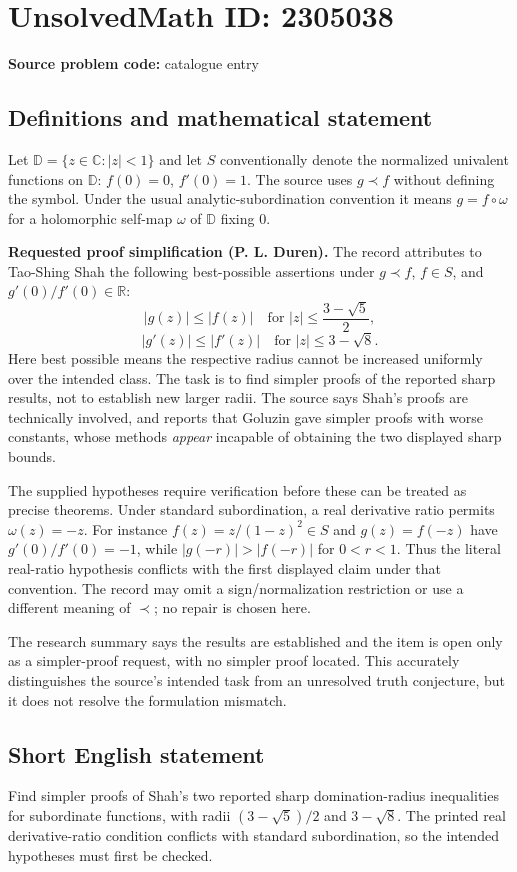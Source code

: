\documentclass[11pt]{article}
\newcommand{\R}{\mathbb{R}}
\newcommand{\C}{\mathbb{C}}
\begin{document}
\section*{UnsolvedMath ID: 2305038}
\textbf{Source problem code:} catalogue entry
\subsection{Definitions and mathematical statement}
Let $\mathbb D=\{z\in\C:|z|<1\}$ and let $S$ conventionally denote the normalized univalent functions on $\mathbb D$: $f(0)=0$, $f'(0)=1$. The source uses $g\prec f$ without defining the symbol. Under the usual analytic-subordination convention it means $g=f\circ\omega$ for a holomorphic self-map $\omega$ of $\mathbb D$ fixing $0$.

\textbf{Requested proof simplification (P. L. Duren).} The record attributes to Tao-Shing Shah the following best-possible assertions under $g\prec f$, $f\in S$, and $g'(0)/f'(0)\in\R$:
\[
 |g(z)|\leq|f(z)|\quad\text{for }|z|\leq\frac{3-\sqrt5}{2},
\]
\[
 |g'(z)|\leq|f'(z)|\quad\text{for }|z|\leq3-\sqrt8.
\]
Here best possible means the respective radius cannot be increased uniformly over the intended class. The task is to find simpler proofs of the reported sharp results, not to establish new larger radii. The source says Shah's proofs are technically involved, and reports that Goluzin gave simpler proofs with worse constants, whose methods \emph{appear} incapable of obtaining the two displayed sharp bounds.

The supplied hypotheses require verification before these can be treated as precise theorems. Under standard subordination, a real derivative ratio permits $\omega(z)=-z$. For instance $f(z)=z/(1-z)^2\in S$ and $g(z)=f(-z)$ have $g'(0)/f'(0)=-1$, while $|g(-r)|>|f(-r)|$ for $0<r<1$. Thus the literal real-ratio hypothesis conflicts with the first displayed claim under that convention. The record may omit a sign/normalization restriction or use a different meaning of $\prec$; no repair is chosen here.

The research summary says the results are established and the item is open only as a simpler-proof request, with no simpler proof located. This accurately distinguishes the source's intended task from an unresolved truth conjecture, but it does not resolve the formulation mismatch.
\subsection{Short English statement}
Find simpler proofs of Shah's two reported sharp domination-radius inequalities for subordinate functions, with radii $(3-\sqrt5)/2$ and $3-\sqrt8$. The printed real derivative-ratio condition conflicts with standard subordination, so the intended hypotheses must first be checked.
\end{document}
